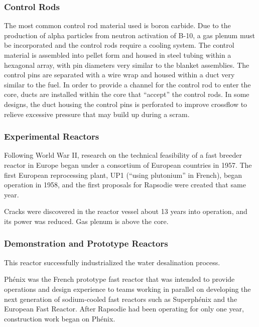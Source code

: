 \documentclass[10pt]{article}
\newcounter{subsubsubsection}[subsubsection]
\numberwithin{equation}{section} %
\begin{document}
\subsubsection{Control Rods}
The most common control rod material used is boron carbide. Due to the production of alpha particles from neutron activation of B-10, a gas plenum must be incorporated and the control rods require a cooling system. The control material is assembled into pellet form and housed in steel tubing within a hexagonal array, with pin diameters very similar to the blanket assemblies. The control pins are separated with a wire wrap and housed within a duct very similar to the fuel. In order to provide a channel for the control rod to enter the core, ducts are installed within the core that ``accept'' the control rods. In some designs, the duct housing the control pins is perforated to improve crossflow to relieve excessive pressure that may build up during a scram.

\subsubsection{Experimental Reactors}
Following World War II, research on the technical feasibility of a fast breeder reactor in Europe began under a consortium of European countries in 1957. The first European reprocessing plant, UP1 (``using plutonium'' in French), began operation in 1958, and the first proposals for Rapsodie were created that same year. 

Cracks were discovered in the reactor vessel about 13 years into operation, and its power was reduced. 
Gas plenum is above the core.


\subsubsection{Demonstration and Prototype Reactors}

This reactor successfully industrialized the water desalination process.


Ph\'{e}nix was the French prototype fast reactor that was intended to provide operations and design experience to teams working in parallel on developing the next generation of sodium-cooled fast reactors such as Superph\'{e}nix and the European Fast Reactor. After Rapsodie had been operating for only one year, construction work began on Ph\'{e}nix. 
\end{document}
